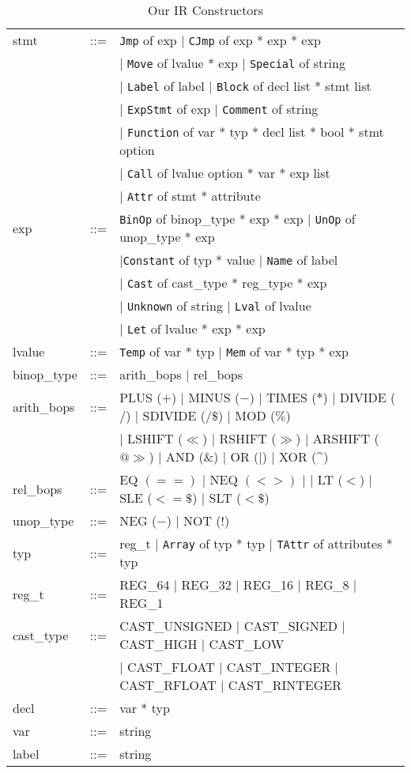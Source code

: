 \begin{table}
\begin{tabular}{lll}
  stmt &::=& {\tt Jmp} of exp $|$ {\tt CJmp} of exp * exp * exp \\
  & & $|$ {\tt Move} of lvalue * exp  $|$ {\tt Special} of string \\
  & & $|$ {\tt Label} of label $|$ {\tt Block} of decl list * stmt list\\
  & & $|$ {\tt ExpStmt} of exp $|$ {\tt Comment} of string  \\
  & & $|$ {\tt Function} of var * typ * decl list * bool * stmt option
  \\
  & & $|$ {\tt Call} of lvalue option * var * exp list \\
  & & $|$ {\tt Attr} of stmt * attribute\\

  exp &::=& {\tt BinOp} of  binop\_type * exp * exp
  $|$ {\tt UnOp} of unop\_type * exp \\
  & & $|${\tt Constant} of typ * value 
  $|$ {\tt Name} of label \\
& &   $|$ {\tt Cast} of cast\_type * reg\_type * exp\\
  & &$|$ {\tt Unknown} of string 
  $|$ {\tt Lval} of lvalue \\
  & & $|$ {\tt Let} of lvalue * exp * exp \\

  lvalue &::=& {\tt Temp}  of var * typ 
  $|$ {\tt Mem} of var * typ * exp \\

  binop\_type &::=& arith\_bops $|$ rel\_bops \\
  arith\_bops&::=& PLUS ($+$) $|$ MINUS ($-$) $|$ TIMES ($*$) $|$ DIVIDE
  ($/$)  $|$ SDIVIDE ($/\$$) $|$ MOD ($\%$) \\
  & & $|$ LSHIFT ($\ll$) $|$ RSHIFT ($\gg$) $|$ ARSHIFT ($@\gg$) 
   $|$ AND ($\&$) $|$ OR ($|$) $|$ XOR (\^{}) \\
  rel\_bops&::=&  EQ $(==)$ $|$ NEQ $(<>)$ $|$ $|$ LT ($<$) $|$
  SLE ($<=\$$) $|$ SLT ($<\$$) \\
  unop\_type&::=& NEG ($-$) $|$ NOT ($!$)\\

  typ&::=& reg\_t $|$ {\tt Array} of typ * typ $|$ {\tt TAttr} of
  attributes * typ\\

  reg\_t&::=& REG\_64 $|$ REG\_32 $|$ REG\_16 $|$ REG\_8 $|$ REG\_1\\
  cast\_type&::=&CAST\_UNSIGNED $|$ CAST\_SIGNED $|$ CAST\_HIGH $|$
  CAST\_LOW \\
  & & $|$ CAST\_FLOAT $|$ CAST\_INTEGER $|$ CAST\_RFLOAT $|$
  CAST\_RINTEGER \\

  decl&::=& var * typ\\
  var&::=& string \\
  label&::=& string 
 
\end{tabular}
\caption{Our IR Constructors}
\label{tab:irsyntax}
\end{table}
